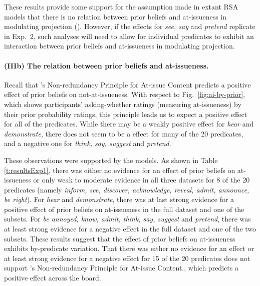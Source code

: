 \documentclass[11pt,fleqn]{article}
\newcommand{\6}{\mbox{$[\hspace*{-.6mm}[$}}
\newcommand{\9}{\mbox{$]\hspace*{-.6mm}]$}}
\newcommand{\citepos}[1]{\citeauthor{#1}'s \citeyear{#1}}
\begin{document}
These results provide some support for the assumption made in extant RSA models that there is no relation between prior beliefs and at-issueness in modulating projection (\citealt{qing-etal2016,stevens-etal2017,warstadt2022,pan-degen2023}). However, if the effects for {\em see, say} and {\em pretend} replicate in Exp.~2, such analyses will need to allow for individual predicates to exhibit an interaction between prior beliefs and at-issueness in modulating projection.

\paragraph{(IIIb) The relation between prior beliefs and at-issueness.} 

Recall that \citepos{tonhauser-etal-eval} Non-redundancy Principle for At-issue Content predicts a positive effect of prior beliefs on not-at-issueness. With respect to Fig.~\ref{fig:ai-by-prior}, which shows participants' asking-whether ratings (measuring at-issueness) by their prior probability ratings, this principle leads us to expect a positive effect for all of the predicates. While there may be a weakly positive effect for {\em hear} and {\em demonstrate}, there does not seem to be a effect for many of the 20 predicates, and a negative one for {\em think, say, suggest} and {\em pretend}.

These observations were supported by the models. As shown in Table \ref{t:resultsExp1}, there was either no evidence for an effect of prior beliefs on at-issueness or only weak to moderate evidence in all three datasets for 8 of the 20 predicates (namely {\em inform, see, discover, acknowledge, reveal, admit, announce, be right}). For {\em hear} and {\em demonstrate}, there was at last strong evidence for a positive effect of prior beliefs on at-issueness in the full dataset and one of the subsets. For {\em be annoyed, know, admit, think, say, suggest} and {\em pretend}, there was at least strong evidence for a negative effect in the full dataset and one of the two subsets. These results suggest that the effect of prior beliefs on at-issueness exhibits by-predicate variation. That there was either no evidence for an effect or at least strong evidence for a negative effect for 15 of the 20 predicates does not support \citepos{tonhauser-etal-eval} Non-redundancy Principle for At-issue Content., which predicts a positive effect across the board.


\setlength{\fboxrule}{0pt}
\end{document}

